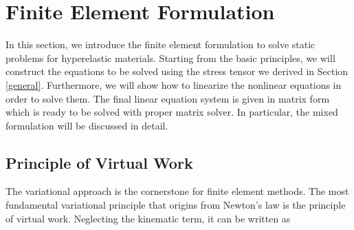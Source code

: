%
\section{Finite Element Formulation}
\label{formulation}
In this section, we introduce the finite element formulation to solve static problems for hyperelastic materials. Starting from the basic principles, we will construct the equations to be solved using the stress tensor we derived in Section \ref{general}. Furthermore, we will show how to linearize the nonlinear equations in order to solve them. The final linear equation system is given in matrix form which is ready to be solved with proper matrix solver. In particular, the mixed formulation will be discussed in detail.

%
\subsection{Principle of Virtual Work} \label{PVW}
The variational approach is the cornerstone for finite element methods. The most fundamental variational principle that origins from Newton's law is the principle of virtual work. Neglecting the kinematic term, it can be written as
